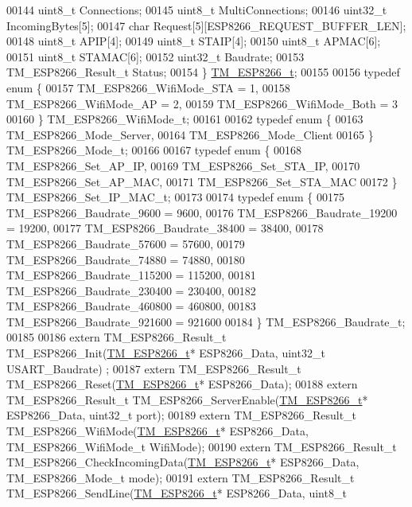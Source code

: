 \begin{DoxyCode}
00144     uint8\_t Connections;
00145     uint8\_t MultiConnections;
00146     uint32\_t IncomingBytes[5];
00147     \textcolor{keywordtype}{char} Request[5][ESP8266\_REQUEST\_BUFFER\_LEN];
00148     uint8\_t APIP[4];
00149     uint8\_t STAIP[4];
00150     uint8\_t APMAC[6];
00151     uint8\_t STAMAC[6];
00152     uint32\_t Baudrate;
00153     TM\_ESP8266\_Result\_t Status;
00154 \} \hyperlink{struct_t_m___e_s_p8266__t}{TM\_ESP8266\_t};
00155 
00156 \textcolor{keyword}{typedef} \textcolor{keyword}{enum} \{
00157     TM\_ESP8266\_WifiMode\_STA = 1,
00158     TM\_ESP8266\_WifiMode\_AP = 2,
00159     TM\_ESP8266\_WifiMode\_Both = 3
00160 \} TM\_ESP8266\_WifiMode\_t;
00161 
00162 \textcolor{keyword}{typedef} \textcolor{keyword}{enum} \{
00163     TM\_ESP8266\_Mode\_Server,
00164     TM\_ESP8266\_Mode\_Client
00165 \} TM\_ESP8266\_Mode\_t;
00166 
00167 \textcolor{keyword}{typedef} \textcolor{keyword}{enum} \{
00168     TM\_ESP8266\_Set\_AP\_IP,
00169     TM\_ESP8266\_Set\_STA\_IP,
00170     TM\_ESP8266\_Set\_AP\_MAC,
00171     TM\_ESP8266\_Set\_STA\_MAC
00172 \} TM\_ESP8266\_Set\_IP\_MAC\_t;
00173 
00174 \textcolor{keyword}{typedef} \textcolor{keyword}{enum} \{
00175     TM\_ESP8266\_Baudrate\_9600 = 9600,
00176     TM\_ESP8266\_Baudrate\_19200 = 19200,
00177     TM\_ESP8266\_Baudrate\_38400 = 38400,
00178     TM\_ESP8266\_Baudrate\_57600 = 57600,
00179     TM\_ESP8266\_Baudrate\_74880 = 74880,
00180     TM\_ESP8266\_Baudrate\_115200 = 115200,
00181     TM\_ESP8266\_Baudrate\_230400 = 230400,
00182     TM\_ESP8266\_Baudrate\_460800 = 460800,
00183     TM\_ESP8266\_Baudrate\_921600 = 921600
00184 \} TM\_ESP8266\_Baudrate\_t;
00185 
00186 \textcolor{keyword}{extern} TM\_ESP8266\_Result\_t TM\_ESP8266\_Init(\hyperlink{struct_t_m___e_s_p8266__t}{TM\_ESP8266\_t}* ESP8266\_Data, uint32\_t USART\_Baudrate)
      ;
00187 \textcolor{keyword}{extern} TM\_ESP8266\_Result\_t TM\_ESP8266\_Reset(\hyperlink{struct_t_m___e_s_p8266__t}{TM\_ESP8266\_t}* ESP8266\_Data);
00188 \textcolor{keyword}{extern} TM\_ESP8266\_Result\_t TM\_ESP8266\_ServerEnable(\hyperlink{struct_t_m___e_s_p8266__t}{TM\_ESP8266\_t}* ESP8266\_Data, uint32\_t port);
00189 \textcolor{keyword}{extern} TM\_ESP8266\_Result\_t TM\_ESP8266\_WifiMode(\hyperlink{struct_t_m___e_s_p8266__t}{TM\_ESP8266\_t}* ESP8266\_Data, 
      TM\_ESP8266\_WifiMode\_t WifiMode);
00190 \textcolor{keyword}{extern} TM\_ESP8266\_Result\_t TM\_ESP8266\_CheckIncomingData(\hyperlink{struct_t_m___e_s_p8266__t}{TM\_ESP8266\_t}* ESP8266\_Data, 
      TM\_ESP8266\_Mode\_t mode);
00191 \textcolor{keyword}{extern} TM\_ESP8266\_Result\_t TM\_ESP8266\_SendLine(\hyperlink{struct_t_m___e_s_p8266__t}{TM\_ESP8266\_t}* ESP8266\_Data, uint8\_t 

\end{DoxyCode}
